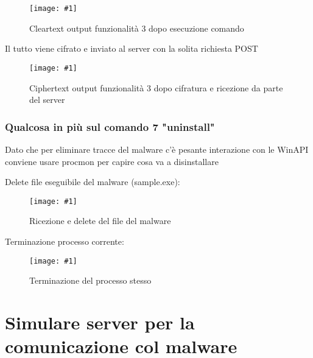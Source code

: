 \documentclass[
    a4paper, %
    11pt %
]{article}
\newcommand{\pic}[4]{\begin{figure}[H]
            \centering
            \texttt{[image: \#1]}
            \caption{#2}
            \label{fig:#1}
            \end{figure}}
\begin{document}
            \pic{chngfmtstr6}{Cleartext output funzionalità 3 dopo esecuzione comando}{15cm}{2.5cm}

            Il tutto viene cifrato e inviato al server con la solita richiesta POST

            \pic{chngfmtstr7}{Ciphertext output funzionalità 3 dopo cifratura e ricezione da parte del server}{19cm}{3cm}

            \subsubsection{Qualcosa in più sul comando 7 "uninstall"}

            Dato che per eliminare tracce del malware c'è pesante interazione con le WinAPI conviene usare
            procmon per capire cosa va a disinstallare

            Delete file eseguibile del malware (sample.exe):

            \pic{uninstall1}{Ricezione e delete del file del malware}{19cm}{4cm}

            Terminazione processo corrente:

            \pic{uninstall2}{Terminazione del processo stesso}{19cm}{3cm}

            \pagebreak
            
            \section{Simulare server per la comunicazione col malware}
\end{document}
